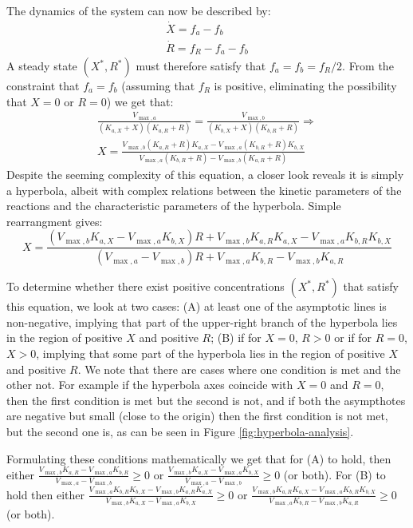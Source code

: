 \documentclass[a4page,notitlepage]{article}
\begin{document}
    The dynamics of the system can now be described by:
    \begin{eqnarray*}
        \dot X = f_a-f_b \\
        \dot R = f_R-f_a-f_b
    \end{eqnarray*}
    A steady state $(X^*,R^*)$ must therefore satisfy that $f_a=f_b=f_R/2$.
    From the constraint that $f_a=f_b$ (assuming that $f_R$ is positive, eliminating the possibility that $X=0$ or $R=0$) we get that:
    \begin{eqnarray*}
        \frac{V_{\max,a}}{(K_{a,X}+X)(K_{a,R}+R)}=\frac{V_{\max,b}}{(K_{b,X}+X)(K_{b,R}+R)} \Rightarrow \\
        X=\frac{V_{\max,b}(K_{a,R}+R)K_{a,X}-V_{\max,a}(K_{b,R}+R)K_{b,X}}{V_{\max,a}(K_{b,R}+R)-V_{\max,b}(K_{a,R}+R)}
    \end{eqnarray*}
    Despite the seeming complexity of this equation, a closer look reveals it is simply a hyperbola, albeit with complex relations between the kinetic parameters of the reactions and the characteristic parameters of the hyperbola.
    Simple rearrangment gives:
    \begin{equation*}
        X=\frac{(V_{\max,b}K_{a,X}-V_{\max,a}K_{b,X})R+V_{\max,b}K_{a,R}K_{a,X}-V_{\max,a}K_{b,R}K_{b,X}}{(V_{\max,a}-V_{\max,b})R+V_{\max,a}K_{b,R}-V_{\max,b}K_{a,R}}
    \end{equation*}

    To determine whether there exist positive concentrations $(X^*,R^*)$ that satisfy this equation, we look at two cases:
    (A) at least one of the asymptotic lines is non-negative, implying that part of the upper-right branch of the hyperbola lies in the region of positive $X$ and positive $R$;
    (B) if for $X=0$, $R>0$ or if for $R=0$, $X>0$, implying that some part of the hyperbola lies in the region of positive $X$ and positive $R$.
    We note that there are cases where one condition is met and the other not.
    For example if the hyperbola axes coincide with $X=0$ and $R=0$, then the first condition is met but the second is not, and if both the asympthotes are negative but small (close to the origin) then the first condition is not met, but the second one is, as can be seen in Figure \ref{fig:hyperbola-analysis}.

    Formulating these conditions mathematically we get that for (A) to hold, then either $\frac{V_{\max,b}K_{a,R}-V_{\max,a}K_{b,R}}{V_{\max,a}-V_{\max,b}}\geq 0$ or $\frac{V_{\max,b}K_{a,X}-V_{\max,a}K_{b,X}}{V_{\max,a}-V_{\max,b}}\geq 0$ (or both).
    For (B) to hold then either $\frac{V_{\max,a}K_{b,R}K_{b,X}-V_{\max,b}K_{a,R}K_{a,X}}{V_{\max,b}K_{a,X}-V_{\max,a}K_{b,X}}\geq 0$ or $\frac{V_{\max,b}K_{a,R}K_{a,X}-V_{\max,a}K_{b,R}K_{b,X}}{V_{\max,a}K_{b,R}-V_{\max,b}K_{a,R}} \geq 0$ (or both).
\end{document}
